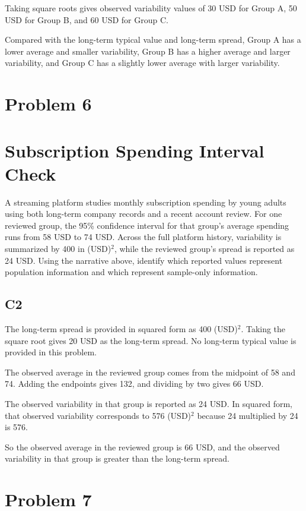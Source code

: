 \begin{ExamProblems}
		Taking square roots gives observed variability values of 30 USD for Group A, 50 USD for Group B, and 60 USD for Group C.

		Compared with the long-term typical value and long-term spread, Group A has a lower average and smaller variability, Group B has a higher average and larger variability, and Group C has a slightly lower average with larger variability.


		\newpage
		\item
		\section{Problem 6}
		\section{Subscription Spending Interval Check}
		A streaming platform studies monthly subscription spending by young adults using both long-term company records and a recent account review.
		For one reviewed group, the 95\% confidence interval for that group's average spending runs from 58 USD to 74 USD.
		Across the full platform history, variability is summarized by 400 in (USD)$^2$, while the reviewed group's spread is reported as 24 USD.
		Using the narrative above, identify which reported values represent population information and which represent sample-only information.

\subsection*{C2}
		The long-term spread is provided in squared form as 400 (USD)$^2$.
		Taking the square root gives 20 USD as the long-term spread.
		No long-term typical value is provided in this problem.

		The observed average in the reviewed group comes from the midpoint of 58 and 74.
		Adding the endpoints gives 132, and dividing by two gives 66 USD.

		The observed variability in that group is reported as 24 USD.
		In squared form, that observed variability corresponds to 576 (USD)$^2$ because 24 multiplied by 24 is 576.

		So the observed average in the reviewed group is 66 USD, and the observed variability in that group is greater than the long-term spread.


		\newpage
		\item
		\section{Problem 7}

\end{ExamProblems}
